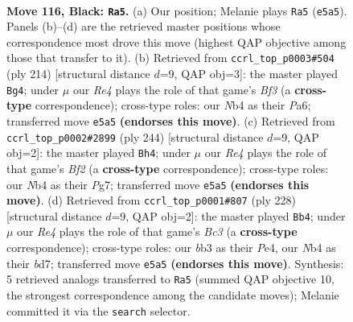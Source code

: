 \documentclass[11pt]{article}
\begin{document}
\clearpage

\begin{figure}[p]\centering
\begin{subfigure}{0.46\textwidth}\centering
\resizebox{\linewidth}{!}{%
\newchessgame
\chessboard[
  setfen={8/8/7k/4r1p1/1n6/1B4K1/8/8 b - - 17 116},
  showmover=false,
  pgfstyle=straightmove, color=movearrow, markmove={e5-a5}
]}
\caption{}
\end{subfigure}\hfill
\begin{subfigure}{0.46\textwidth}\centering
\resizebox{\linewidth}{!}{%
\newchessgame
\chessboard[
  setfen={8/b3k3/P7/3P4/2K5/5B2/8/8 w - - 27 108},
  showmover=false,
  pgfstyle=straightmove, color=movearrow, markmove={f3-g4}
]}
\caption{}
\end{subfigure}
\\[4pt]
\begin{subfigure}{0.46\textwidth}\centering
\resizebox{\linewidth}{!}{%
\newchessgame
\chessboard[
  setfen={2k5/6P1/3P4/4K3/8/1b6/5B2/8 w - - 29 123},
  showmover=false,
  pgfstyle=straightmove, color=movearrow, markmove={f2-h4}
]}
\caption{}
\end{subfigure}\hfill
\begin{subfigure}{0.46\textwidth}\centering
\resizebox{\linewidth}{!}{%
\newchessgame
\chessboard[
  setfen={8/3b4/7k/8/4P3/2B2P2/5K2/8 w - - 53 115},
  showmover=false,
  pgfstyle=straightmove, color=movearrow, markmove={c3-b4}
]}
\caption{}
\end{subfigure}
\caption{\textbf{Move 116, Black: \texttt{Ra5}.} (a) Our position; Melanie plays \texttt{Ra5} (\texttt{e5a5}). Panels (b)--(d) are the retrieved master positions whose correspondence most drove this move (highest QAP objective among those that transfer to it). (b) Retrieved from \texttt{ccrl\_top\_p0003\#504} (ply 214) [structural distance $d$=9, QAP obj=3]: the master played \texttt{Bg4}; under $\mu$ our \emph{Re4} plays the role of that game's \emph{Bf3} (a \textbf{cross-type} correspondence); cross-type roles: our \emph{N}b4 as their \emph{P}a6; transferred move \texttt{e5a5} \textbf{(endorses this move)}. (c) Retrieved from \texttt{ccrl\_top\_p0002\#2899} (ply 244) [structural distance $d$=9, QAP obj=2]: the master played \texttt{Bh4}; under $\mu$ our \emph{Re4} plays the role of that game's \emph{Bf2} (a \textbf{cross-type} correspondence); cross-type roles: our \emph{N}b4 as their \emph{P}g7; transferred move \texttt{e5a5} \textbf{(endorses this move)}. (d) Retrieved from \texttt{ccrl\_top\_p0001\#807} (ply 228) [structural distance $d$=9, QAP obj=2]: the master played \texttt{Bb4}; under $\mu$ our \emph{Re4} plays the role of that game's \emph{Bc3} (a \textbf{cross-type} correspondence); cross-type roles: our \emph{b}b3 as their \emph{P}e4, our \emph{N}b4 as their \emph{b}d7; transferred move \texttt{e5a5} \textbf{(endorses this move)}. Synthesis: 5 retrieved analogs transferred to \texttt{Ra5} (summed QAP objective 10, the strongest correspondence among the candidate moves); Melanie committed it via the \texttt{search} selector.}
\label{fig:thought-m231}
\end{figure}
\end{document}
